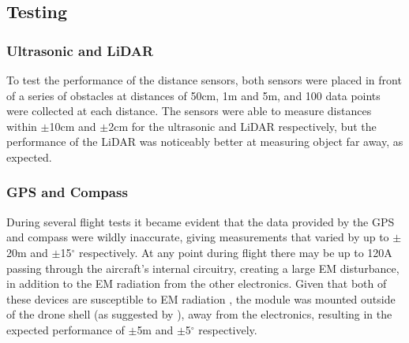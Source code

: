 \subsection{Testing}
\subsubsection*{Ultrasonic and LiDAR}
To test the performance of the distance sensors, both sensors were placed in front of a series of obstacles at distances of 50cm, 1m and 5m, and 100 data points were collected at each distance. The sensors were able to measure distances within $\pm$10cm and $\pm$2cm for the ultrasonic and LiDAR respectively, but the performance of the LiDAR was noticeably better at measuring object far away, as expected.  
	
\subsubsection*{GPS and Compass}  
During several flight tests it became evident that the data provided by the GPS and compass were wildly inaccurate, giving measurements that varied by up to $\pm$20m and $\pm$15$^\circ$ respectively. At any point during flight there may be up to 120A passing through the aircraft's internal circuitry, creating a large EM disturbance, in addition to the EM radiation from the other electronics. Given that both of these devices are susceptible to EM radiation \cite{ref:gpsinterference}, the module was mounted outside of the drone shell (as suggested by \cite{ref:gpsposition}), away from the electronics, resulting in the expected performance of $\pm$5m and $\pm$5$^\circ$ respectively.